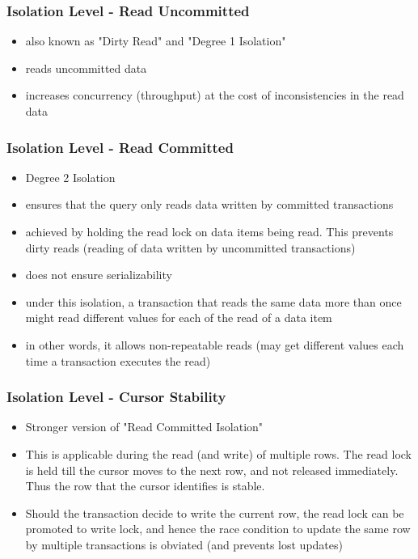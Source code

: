 \documentclass[12]{beamer}
\begin{document}
\begin{frame}
\frametitle{Isolation Level - Read Uncommitted}
\begin{itemize}
\item also known as "Dirty Read" and "Degree 1 Isolation"
\item reads uncommitted data
\item increases concurrency (throughput) at the cost of inconsistencies in the read data
\end{itemize}
\end{frame}

\begin{frame}
\frametitle{Isolation Level - Read Committed}
\begin{itemize}
\item Degree 2 Isolation
\item ensures that the query only reads data written by committed transactions
\item achieved by holding the read lock on data items being read. This prevents dirty reads (reading of data written by uncommitted transactions)
\item does not ensure serializability
\item under this isolation, a transaction that reads the same data more than once might read different values for each of the read of a data item
\item in other words, it allows non-repeatable reads (may get different values each time a transaction executes the read)
\end{itemize}
\end{frame}

\begin{frame}
\frametitle{Isolation Level - Cursor Stability}
\begin{itemize}
\item Stronger version of "Read Committed Isolation"
\item This is applicable during the read (and write) of multiple rows. The read lock is held till the cursor moves to the next row, and not released immediately. Thus the row that the cursor identifies is stable.
\item Should the transaction decide to write the current row, the read lock can be promoted to write lock, and hence the race condition to update the same row by multiple transactions is obviated (and prevents lost updates)
\end{itemize}
\end{frame}
\end{document}
